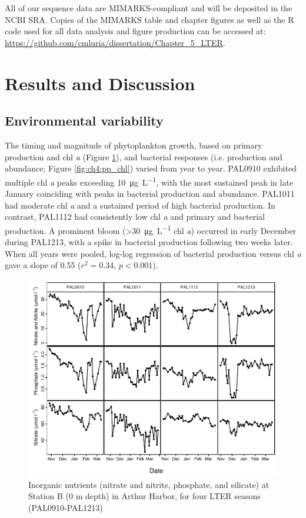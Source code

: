 All of our sequence data are MIMARKS-compliant \citep{Yilmaz:2011aa} and will be deposited in the NCBI SRA. Copies of the MIMARKS table and chapter figures as well as the R code used for all data analysis and figure production can be accessed at: \url{https://github.com/cmluria/dissertation/Chapter_5_LTER}. 

\section{Results and Discussion}

\subsection{Environmental variability}

The timing and magnitude of phytoplankton growth, based on primary production and chl \emph{a} (Figure \ref{fig:ch4:inorganic_nuts}), and bacterial responses (i.e. production and abundance; Figure \ref{fig:ch4:pp_chl}) varied from year to year. PAL0910 exhibited multiple chl \emph{a} peaks exceeding \SI{10}{\micro\gram \per\liter}, with the most sustained peak in late January coinciding with peaks in bacterial production and abundance. PAL1011 had moderate chl \emph{a} and a sustained period of high bacterial production. In contrast, PAL1112 had consistently low chl \emph{a} and primary and bacterial production. A prominent bloom ({\textgreater}\SI{30}{\micro\gram \per\liter} chl \emph{a}) occurred in early December during PAL1213, with a spike in bacterial production following two weeks later. When all years were pooled, log-log regression of bacterial production versus chl \emph{a} gave a slope of 0.55 ($r^{2} = 0.34$, $p < 0.001$). 

\begin{figure}[htbp] 
\centering 
\includegraphics[width=1.0\textwidth]{Chapter_5_LTER/Figures/Figure_1_inorganic_nutrients}
\caption[Inorganic nutrients (nitrate and nitrite, phosphate, and silicate) at Station B across four LTER seasons (PAL0910-PAL1213).]{Inorganic nutrients (nitrate and nitrite, phosphate, and silicate) at Station B (0 m depth) in Arthur Harbor, for four LTER seasons (PAL0910-PAL1213)} 
\label{fig:ch4:inorganic_nuts} 
\end{figure}

